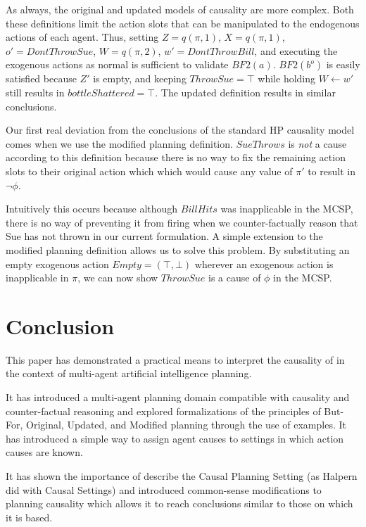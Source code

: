 \documentclass{article}
\theoremstyle{plain}
\theoremstyle{definition}
\begin{document}
As always, the original and updated models of causality are more complex. Both these definitions limit the action slots that can be manipulated to the endogenous actions of each agent. Thus, setting $Z=q(\pi,1)$, $X=q(\pi,1)$, $o'=DontThrowSue$, $W=q(\pi,2)$, $w'=DontThrowBill$, and executing the exogenous actions as normal is sufficient to validate $BF2(a)$. $BF2(b^o)$ is easily satisfied because $Z'$ is empty, and keeping $ThrowSue=\top$ while holding $W\leftarrow w'$ still results in $bottleShattered=\top$. The updated definition results in similar conclusions.

Our first real deviation from the conclusions of the standard HP causality model comes when we use the modified planning definition. $SueThrows$ is \textit{not} a cause according to this definition because there is no way to fix the remaining action slots to their original action which which would cause any value of $\pi'$ to result in $\lnot \phi$.

Intuitively this occurs because although $BillHits$ was inapplicable in the MCSP, there is no way of preventing it from firing when we counter-factually reason that Sue has not thrown in our current formulation. A simple extension to the modified planning definition allows us to solve this problem. By substituting an empty exogenous action $Empty=(\top, \bot)$ wherever an exogenous action is inapplicable in $\pi$, we can now show $ThrowSue$ is a cause of $\phi$ in the MCSP.





\section{Conclusion} \label{conclusion}

This paper has demonstrated a practical means to interpret the causality of \citet{halpern2005causes} in the context of multi-agent artificial intelligence planning.

It has introduced a multi-agent planning domain compatible with causality and counter-factual reasoning and explored formalizations of the principles of But-For, Original, Updated, and Modified planning through the use of examples. It has introduced a simple way to assign agent causes to settings in which action causes are known.

It has shown the importance of describe the Causal Planning Setting (as Halpern did with Causal Settings) and introduced common-sense modifications to planning causality which allows it to reach conclusions similar to those on which it is based.
\end{document}
